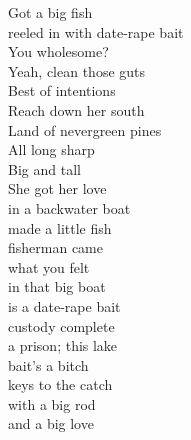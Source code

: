 Got a big fish\\
reeled in with date-rape bait\\
You wholesome?\\
Yeah, clean those guts\\
Best of intentions\\
Reach down her south\\
Land of nevergreen pines\\
All long sharp\\
Big and tall\\
She got her love\\
in a backwater boat\\
made a little fish\\
fisherman came\\
what you felt\\
in that big boat\\
is a date-rape bait\\
custody complete\\
a prison; this lake\\
bait's a bitch\\
keys to the catch\\
with a big rod\\
and a big love\\

